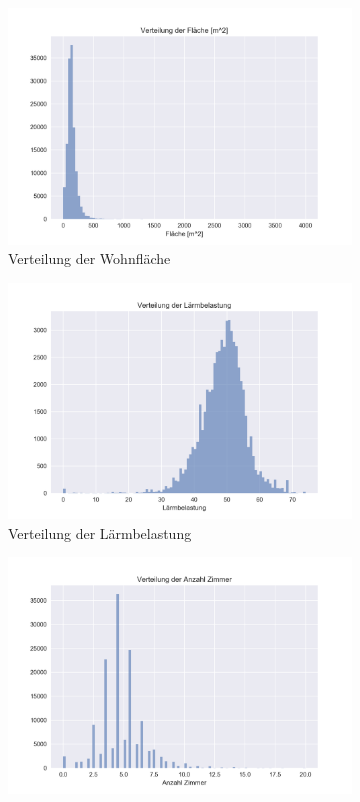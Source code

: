 \begin{figure}[h]
\begin{subfigure}{.5\textwidth}
  \centering
  \includegraphics[width=\linewidth]{images/anhang/analysis/Verteilung_living_area.png}
  \caption{Verteilung der Wohnfläche}
\end{subfigure}
\begin{subfigure}{.5\textwidth}
  \centering
  \includegraphics[width=\linewidth]{images/anhang/analysis/Verteilung_noise_level.png}
  \caption{Verteilung der Lärmbelastung}
\end{subfigure}
\begin{subfigure}{.5\textwidth}
  \centering
  \includegraphics[width=\linewidth]{images/anhang/analysis/Verteilung_num_rooms.png}

\end{subfigure}
\end{figure}
